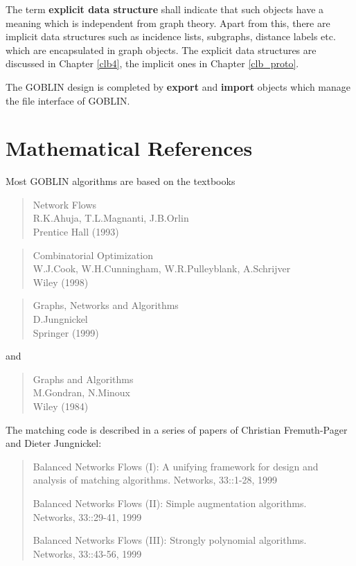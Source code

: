 \documentclass[a4paper,11pt,twoside]{book}
\begin{document}
\begin{multicols}{2}
The term {\bf explicit data structure} shall indicate that such objects have
a meaning which is independent from graph theory. Apart from this, there are
implicit data structures such as incidence lists, subgraphs, distance labels
etc. which are encapsulated in graph objects. The explicit data structures
are discussed in Chapter \ref{clb4}, the implicit ones in Chapter \ref{clb_proto}.

The GOBLIN design is completed by {\bf export} and {\bf import} objects
which manage the file interface of GOBLIN.



\section{Mathematical References}
\label{slb_mathref}

Most GOBLIN algorithms are based on the textbooks
\begin{quote}
Network Flows \\
R.K.Ahuja, T.L.Magnanti, J.B.Orlin \\
Prentice Hall (1993)
\end{quote}
\begin{quote}
Combinatorial Optimization \\
W.J.Cook, W.H.Cunningham, W.R.Pulleyblank, A.Schrijver \\
Wiley (1998)
\end{quote}
\begin{quote}
Graphs, Networks and Algorithms \\
D.Jungnickel \\
Springer (1999)
\end{quote}
and
\begin{quote}
Graphs and Algorithms \\
M.Gondran, N.Minoux \\
Wiley (1984)
\end{quote}
The matching code is described in a series of papers of Christian Fremuth-Pager
and Dieter Jungnickel:
\begin{quote}
Balanced Networks Flows (I):
    A unifying framework for design and analysis of matching
    algorithms. Networks, 33::1-28, 1999

Balanced Networks Flows (II):
    Simple augmentation algorithms. \\
    Networks, 33::29-41, 1999

Balanced Networks Flows (III):
    Strongly polynomial algorithms. \\
    Networks, 33::43-56, 1999


\end{quote}
\end{multicols}
\end{document}

